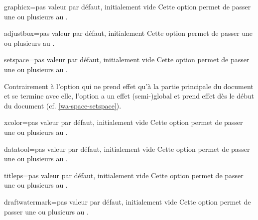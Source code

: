 \begin{docKey}{graphicx}{=}{pas valeur par défaut,
    initialement vide}
  Cette option permet de passer une ou plusieurs  au
  .
\end{docKey}
\begin{docKey}{adjustbox}{=}{pas valeur par défaut,
    initialement }
  Cette option permet de passer une ou plusieurs  au
  .
\end{docKey}
\begin{docKey}{setspace}{=}{pas valeur par défaut,
    initialement vide}
  Cette option permet de passer une ou plusieurs  au
  .

  Contrairement à l'option  qui ne prend effet qu'à la partie
  principale du document et se termine avec elle, l'option 
  a un effet (semi-)global et prend effet dès le début du document
  (cf. \vref{wa-space-setspace}).
\end{docKey}
\begin{docKey}{xcolor}{=}{pas valeur par défaut,
    initialement vide}
  Cette option permet de passer une ou plusieurs  au
  .
\end{docKey}
\begin{docKey}{datatool}{=}{pas valeur par défaut,
    initialement vide}
  Cette option permet de passer une ou plusieurs  au
  .
\end{docKey}
\begin{docKey}{titleps}{=}{pas valeur par défaut, initialement
    vide}
  Cette option permet de passer une ou plusieurs  au
  .
\end{docKey}
\begin{docKey}{draftwatermark}{=}{pas valeur par défaut,
    initialement vide}
  Cette option permet de passer une ou plusieurs  au
  .
\end{docKey}
